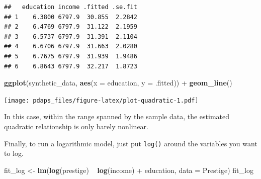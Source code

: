 \documentclass[12pt,oneside,openany]{book}
\newenvironment{Shaded}{\begin{snugshade}}{\end{snugshade}}
\newcommand{\KeywordTok}[1]{\textcolor[rgb]{0.13,0.29,0.53}{\textbf{{#1}}}}
\newcommand{\DataTypeTok}[1]{\textcolor[rgb]{0.13,0.29,0.53}{{#1}}}
\newcommand{\DecValTok}[1]{\textcolor[rgb]{0.00,0.00,0.81}{{#1}}}
\newcommand{\StringTok}[1]{\textcolor[rgb]{0.31,0.60,0.02}{{#1}}}
\newcommand{\NormalTok}[1]{{#1}}
\begin{document}
\begin{Shaded}
\end{Shaded}

\begin{verbatim}
##   education income .fitted .se.fit
## 1    6.3800 6797.9  30.855  2.2842
## 2    6.4769 6797.9  31.122  2.1959
## 3    6.5737 6797.9  31.391  2.1104
## 4    6.6706 6797.9  31.663  2.0280
## 5    6.7675 6797.9  31.939  1.9486
## 6    6.8643 6797.9  32.217  1.8723
\end{verbatim}

\begin{Shaded}
\begin{Highlighting}[]
\KeywordTok{ggplot}\NormalTok{(synthetic_data, }\KeywordTok{aes}\NormalTok{(}\DataTypeTok{x =} \NormalTok{education, }\DataTypeTok{y =} \NormalTok{.fitted)) +}
\StringTok{    }\KeywordTok{geom_line}\NormalTok{()}
\end{Highlighting}
\end{Shaded}

\texttt{[image: pdaps\_files/figure-latex/plot-quadratic-1.pdf]}

In this case, within the range spanned by the sample data, the estimated
quadratic relationship is only barely nonlinear.

Finally, to run a logarithmic model, just put \texttt{log()} around the
variables you want to log.

\begin{Shaded}
\begin{Highlighting}[]
\NormalTok{fit_log <-}\StringTok{ }\KeywordTok{lm}\NormalTok{(}\KeywordTok{log}\NormalTok{(prestige) ~}\StringTok{ }\KeywordTok{log}\NormalTok{(income) +}\StringTok{ }\NormalTok{education, }\DataTypeTok{data =} \NormalTok{Prestige)}
\NormalTok{fit_log}
\end{Highlighting}
\end{Shaded}
\end{document}
